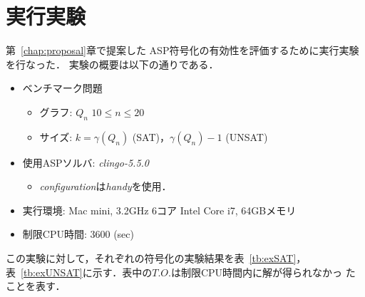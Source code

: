\chapter{実行実験}\label{chap:experiment}

第~\ref{chap:proposal}章で提案した
ASP符号化の有効性を評価するために実行実験を行なった．
実験の概要は以下の通りである．

\begin{itemize}
 \item ベンチマーク問題
 \begin{itemize}
      \item グラフ: $Q_{n}$ $10 \le n \le 20$ 
      \item サイズ: $ k = \gamma(Q_n)$ (SAT)，$\gamma(Q_n)-1$ (UNSAT)%
 \end{itemize}
 \item 使用ASPソルバ: \textit{clingo-5.5.0}
       \begin{itemize}
	\item \textit{configuration}は\textit{handy}を使用．
       \end{itemize}
 \item 実行環境: Mac mini, 3.2GHz 6コア Intel Core i7, 64GBメモリ
 \item 制限CPU時間: 3600 (sec)
\end{itemize}

この実験に対して，それぞれの符号化の実験結果を表~\ref{tb:exSAT}，
表~\ref{tb:exUNSAT}に示す．表中の$T.O.$は制限CPU時間内に解が得られなかっ
たことを表す．

